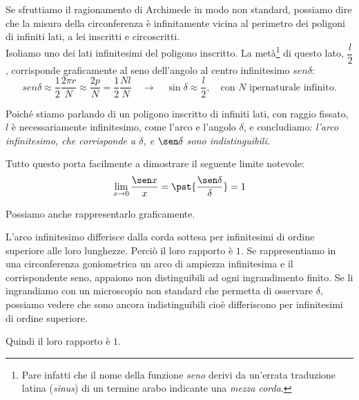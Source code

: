 
Se sfruttiamo il ragionamento di Archimede in modo non standard, possiamo dire 
che la misura della circonferenza è infinitamente vicina al perimetro dei 
poligoni di infiniti lati, a lei inscritti e circoscritti.\\
Isoliamo uno dei lati infinitesimi del poligono inscritto. La 
metà\footnote{Pare infatti che il nome della funzione \emph{seno} derivi da 
un'errata traduzione latina (\emph{sinus}) di un termine arabo indicante una 
\emph{mezza corda}.} di questo lato, \(\dfrac{l}{2}\), corrisponde graficamente 
al seno 
dell'angolo al centro infinitesimo \(sen \delta\):
\[sen \delta \approx \dfrac{1}{2}\dfrac{2\pi r}{N}\approx \dfrac{2p}{N}=
\dfrac{1}{2}\dfrac{Nl}{N}\quad \rightarrow\quad
\sin \delta \approx\dfrac{l}{2},\quad \text{con } N \text{ ipernaturale 
infinito.}  \]

Poiché stiamo parlando di un poligono inscritto di infiniti lati, con 
raggio fissato, \(l\) è necessariamente infinitesimo, come l'arco e l'angolo 
\(\delta\), e concludiamo: \emph{l'arco infinitesimo, che corrisponde a  
\(\delta\), e \(\sen\delta\) sono indistinguibili}.

Tutto questo porta facilmente a dimostrare il seguente limite notevole:
\[\lim_{x \rightarrow 0}\frac{\sen x}{x} = 
  \pst{\frac{\sen \delta}{\delta}} = 1\]
  
Possiamo anche rappresentarlo graficamente.

\begin{minipage}{.49\textwidth}
L'arco infinitesimo differisce dalla corda sottesa per infinitesimi di ordine 
superiore alle loro lunghezze. Perciò il loro rapporto è \(1\).
Se rappresentiamo in una circonferenza goniometrica un arco di ampiezza 
infinitesima e il corrispondente seno, appaiono non distinguibili ad ogni 
ingrandimento finito. 
Se li ingrandiamo con un microscopio non standard che permetta di 
osservare \(\delta\), possiamo vedere che sono ancora indistinguibili 
cioè differiscono per infinitesimi di ordine superiore. 

Quindi il loro rapporto è \(1\).
\end{minipage}
\hfill
\begin{minipage}{.49\textwidth}
\begin{center} \limiteseno \end{center}
\end{minipage}

